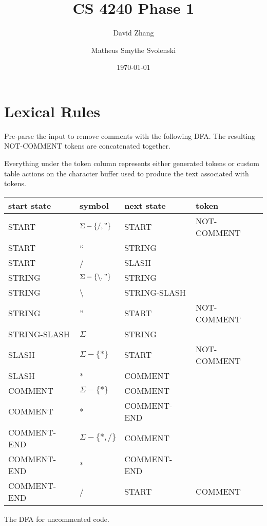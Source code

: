 \documentclass[11pt, fleqn]{article}
\begin{document}
\title{CS 4240 Phase 1}
\author{David Zhang \and Matheus Smythe Svolenski}
\date{\today}

\newtheorem{Lemma}{Lemma}
\newtheorem{Theorem}{Theorem}
\maketitle

\section{Lexical Rules}

Pre-parse the input to remove comments with the following DFA. The resulting NOT-COMMENT tokens are concatenated together.

Everything under the token column represents either generated tokens or custom table actions on the character buffer used to produce the text associated with tokens.

\begin{longtable}{l|l|l|l}
start state		&	symbol							&	next	 state		&	token		 	\\
\hline
START			&	$\Sigma - \{/, "\}$				& 	START			&	NOT-COMMENT		\\
START			&	``								& 	STRING			&					\\
START			&	/								&	SLASH			&					\\
STRING			&	$\Sigma - \{\backslash, "\}$		& 	STRING			&					\\
STRING			&	\textbackslash					& 	STRING-SLASH		&					\\
STRING			&	''								& 	START			&	NOT-COMMENT		\\
STRING-SLASH		&	$\Sigma$							&	STRING			&					\\
SLASH			&	$\Sigma - \{*\}$					&	START			&	NOT-COMMENT		\\
SLASH			&	*								&	COMMENT			&					\\
COMMENT			&	$\Sigma - \{*\}$					&	COMMENT			&					\\
COMMENT			&	*								&	COMMENT-END		&					\\
COMMENT-END		&	$\Sigma - \{*, /\}$				&	COMMENT			&					\\
COMMENT-END		&	*								&	COMMENT-END		&					\\
COMMENT-END		&	/								&	START			&	COMMENT			\\
\end{longtable}

The DFA for uncommented code.
\end{document}
